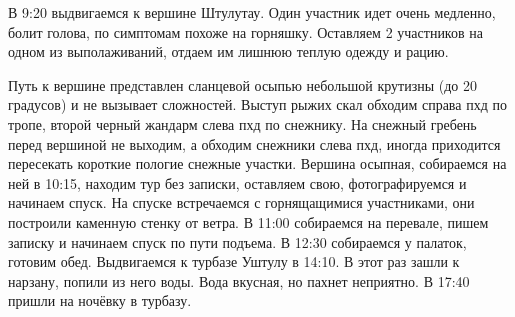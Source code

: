 В 9:20 выдвигаемся к вершине Штулутау. Один участник идет очень медленно, болит голова, по симптомам похоже на горняшку. Оставляем 2 участников на одном из выполаживаний, отдаем им лишнюю теплую одежду и рацию.

Путь к вершине представлен сланцевой осыпью небольшой крутизны (до 20 градусов) и не вызывает сложностей.  Выступ рыжих скал обходим справа пхд по тропе, второй черный жандарм слева пхд по снежнику. На снежный гребень перед вершиной не выходим, а обходим снежники слева пхд, иногда приходится пересекать короткие пологие снежные участки. Вершина осыпная, собираемся на ней в 10:15, находим тур без записки, оставляем свою, фотографируемся и начинаем спуск. На спуске встречаемся с горнящащимися участниками, они построили каменную стенку от ветра. В 11:00 собираемся на перевале, пишем записку и начинаем спуск по пути подъема.
В 12:30 собираемся у палаток, готовим обед. Выдвигаемся к турбазе Уштулу в 14:10. В этот раз зашли к нарзану, попили из него воды. Вода вкусная, но пахнет неприятно. В 17:40 пришли на ночёвку в турбазу.











